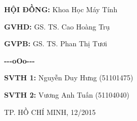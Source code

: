 \documentclass[12pt,a4paper,twoside]{report}
\begin{document}
\vspace{2.2cm}

\begin{minipage}{0.35\textwidth}
\phantom{ababab}
\end{minipage}
\begin{minipage}{0.65\textwidth}
\large
\textbf{HỘI ĐỒNG:} Khoa Học Máy Tính\par
\textbf{GVHD:} GS. TS. Cao Hoàng Trụ\par
\textbf{GVPB:} GS. TS. Phan Thị Tươi\par
\end{minipage}

\vspace{0.2cm}
{\large\bfseries\centering-{}-{}-oOo-{}-{}-\par}
\begin{minipage}{0.35\textwidth}
\phantom{ababab}
\end{minipage}
\begin{minipage}{0.65\textwidth}
\large
\textbf{SVTH 1:} Nguyễn Duy Hưng (51101475)\par
\textbf{SVTH 2:} Vương Anh Tuấn (51104040)\par
\end{minipage}

\vspace{3cm}
\large TP. HỒ CHÍ MINH, 12/2015
\end{document}
